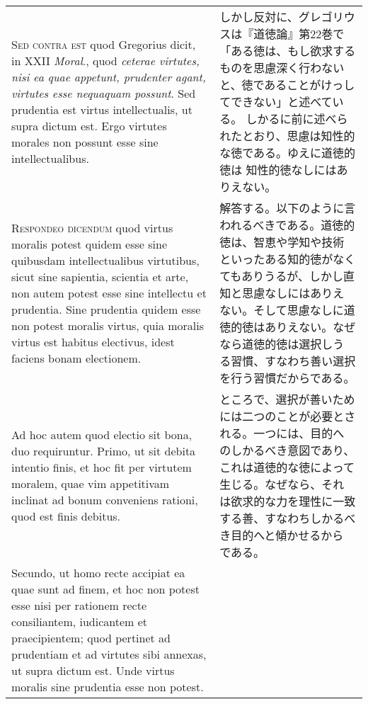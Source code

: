\documentclass[10pt]{jsarticle}
\begin{document}
\begin{longtable}{p{21em}p{21em}}
\\



{\scshape Sed contra est} quod Gregorius dicit, in XXII {\itshape
Moral}., quod {\itshape ceterae virtutes, nisi ea quae appetunt,
prudenter agant, virtutes esse nequaquam possunt}. Sed prudentia est
virtus intellectualis, ut supra dictum est. Ergo virtutes morales non
possunt esse sine intellectualibus.

&

しかし反対に、グレゴリウスは『道徳論』第22巻で「ある徳は、もし欲求する
ものを思慮深く行わないと、徳であることがけっしてできない」と述べている。
しかるに前に述べられたとおり、思慮は知性的な徳である。ゆえに道徳的徳は
知性的徳なしにはありえない。

\\



{\scshape Respondeo dicendum} quod virtus moralis potest quidem esse
sine quibusdam intellectualibus virtutibus, sicut sine sapientia,
scientia et arte, non autem potest esse sine intellectu et
prudentia. Sine prudentia quidem esse non potest moralis virtus, quia
moralis virtus est habitus electivus, idest faciens bonam electionem.

&

解答する。以下のように言われるべきである。道徳的徳は、智恵や学知や技術
といったある知的徳がなくてもありうるが、しかし直知と思慮なしにはありえ
ない。そして思慮なしに道徳的徳はありえない。なぜなら道徳的徳は選択しう
る習慣、すなわち善い選択を行う習慣だからである。

\\



Ad hoc autem quod electio sit bona, duo requiruntur. Primo, ut sit
debita intentio finis, et hoc fit per virtutem moralem, quae vim
appetitivam inclinat ad bonum conveniens rationi, quod est finis
debitus.

&

ところで、選択が善いためには二つのことが必要とされる。一つには、目的へ
のしかるべき意図であり、これは道徳的な徳によって生じる。なぜなら、それ
は欲求的な力を理性に一致する善、すなわちしかるべき目的へと傾かせるから
である。

\\

Secundo, ut homo recte accipiat ea quae sunt ad finem, et hoc non
potest esse nisi per rationem recte consiliantem, iudicantem et
praecipientem; quod pertinet ad prudentiam et ad virtutes sibi
annexas, ut supra dictum est. Unde virtus moralis sine prudentia esse
non potest.


\end{longtable}
\end{document}
